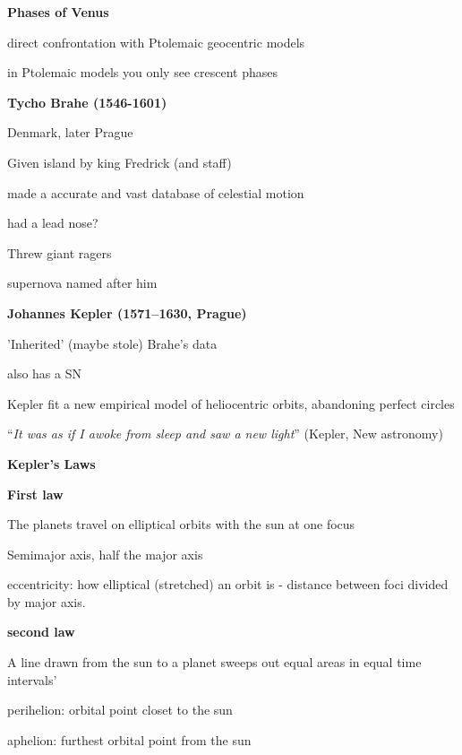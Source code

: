\documentclass{article}
\begin{document}
\noindent \textbf{\large Phases of Venus}
\begin{list}{-}{}
\item direct confrontation with Ptolemaic geocentric models
\item in Ptolemaic models you only see crescent phases 
\end{list}

\noindent \textbf{\large Tycho Brahe (1546-1601)}
\begin{list}{-}{}
\item Denmark, later Prague
\item Given island by king Fredrick (and staff)
\item made a accurate and vast database of celestial motion
\item had a lead nose?
\item Threw giant ragers
\item supernova named after him 
\end{list}

\noindent \textbf{\large Johannes Kepler (1571–1630, Prague)}
\begin{list}{-}{}
\item 'Inherited' (maybe stole) Brahe's data 
\item also has a SN
\item Kepler fit a new empirical model of heliocentric orbits, abandoning perfect circles 
\begin{list}{-}{}
\item ``\textit{It was as if I awoke from sleep and saw a new light}'' (Kepler, New astronomy)
\end{list}
\end{list}

\noindent \textbf{\large Kepler's Laws}

\noindent \textbf{First law}

\begin{list}{-}{}
\item The planets travel on elliptical orbits with the sun at one focus
\item Semimajor axis, half the major axis 
\item eccentricity: how elliptical (stretched) an orbit is - distance between foci divided by major axis.
\end{list}

\noindent \textbf{second law }

\begin{list}{-}{}
\item A line drawn from the sun to a planet sweeps out equal areas in equal time intervals'
\item perihelion: orbital point closet to the sun
\item aphelion: furthest orbital point from the sun
\end{list}
\end{document}
